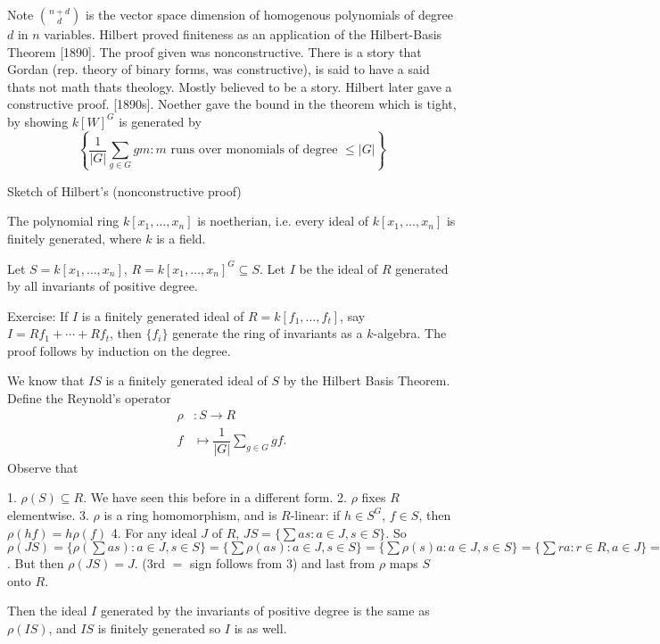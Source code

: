 Note $\binom{n+d}{d}$ is the vector space dimension of homogenous polynomials of degree $d$ in $n$ variables. Hilbert proved finiteness as an application of the Hilbert-Basis Theorem [1890]. The proof given was  nonconstructive. There is a story that Gordan (rep. theory of binary forms, was constructive), is said to have a said thats not math thats theology. Mostly believed to be a story. Hilbert later gave a constructive proof. [1890s]. Noether gave the bound in the theorem which is tight, by showing $k[W]^G$ is generated by
	\[
	\left\{\dfrac{1}{|G|} \sum_{g \in G } gm \colon m \text{ runs over monomials of degree } \leq |G| \right\}
	\]


Sketch of Hilbert's (nonconstructive proof)

\begin{thm}
The polynomial ring $k[x_1,\ldots,x_n]$ is noetherian, i.e. every ideal of $k[x_1,\ldots,x_n]$ is finitely generated, where $k$ is a field.
\end{thm}

Let $S=k[x_1,\ldots,x_n]$, $R=k[x_1,\ldots,x_n]^G \subseteq S$. Let $I$ be the ideal of $R$ generated by all invariants of positive degree. 

Exercise: If $I$ is a finitely generated ideal of $R=k[f_1,\ldots,f_t]$, say $I=Rf_1+\cdots+Rf_t$, then $\{f_i\}$ generate the ring of invariants as a $k$-algebra. The proof follows by induction on the degree. 


We know that $IS$ is a finitely generated ideal of $S$ by the Hilbert Basis Theorem. Define the Reynold's operator 
	\[
	\begin{split}
	\rho&: S \to R \\
	f&\mapsto \dfrac{1}{|G|} \sum_{g \in G} gf.
	\end{split}
	\]
Observe that 

1. $\rho(S) \subseteq R$. We have seen this before in a different form.
2. $\rho$ fixes $R$ elementwise. 
3. $\rho$ is a ring homomorphism, and is $R$-linear: if $h \in S^G$, $f \in S$, then $\rho(hf)=h \rho(f)$
4. For any ideal $J$ of $R$, $JS=\{ \sum as \colon a \in J, s \in S\}$. So $\rho(JS)=\{ \rho(\sum as) \colon a \in J, s \in S\}= \{ \sum \rho(as) \colon a \in J, s \in S\}= \{ \sum \rho(s)a \colon a \in J, s \in S\}= \{ \sum ra \colon r \in R, a \in J\}= J$. But then $\rho(JS)=J$. (3rd $=$ sign follows from 3) and last from $\rho$ maps $S$ onto $R$. 


Then the ideal $I$ generated by the invariants of positive degree is the same as $\rho(IS)$, and $IS$ is finitely generated so $I$ is as well. 


